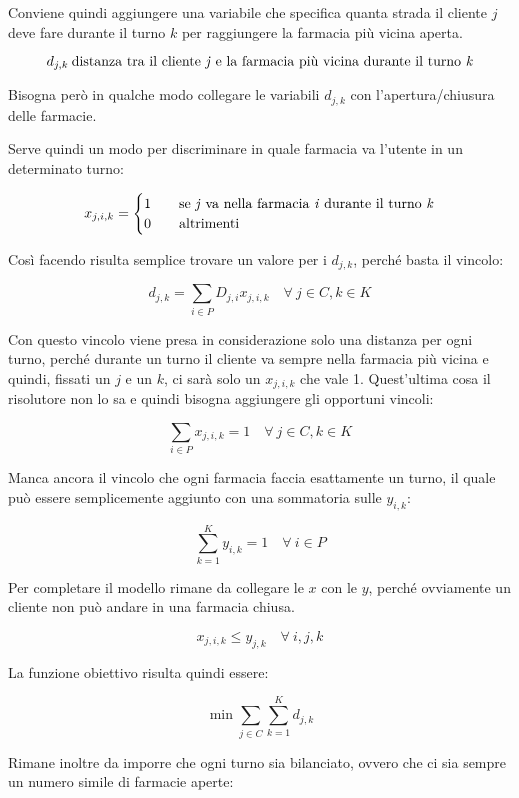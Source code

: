Conviene quindi aggiungere una variabile che specifica quanta strada il cliente $j$ deve fare durante il turno $k$ per raggiungere la farmacia più vicina aperta.

$$
d_{j,k} \: \text{distanza tra il cliente \textit{j} e la farmacia più vicina durante il turno \textit{k}}
$$

\noindent Bisogna però in qualche modo collegare le variabili $d_{j,k}$ con l'apertura/chiusura delle farmacie.

Serve quindi un modo per discriminare in quale farmacia va l'utente in un determinato turno:

$$
x_{j,i,k} = \begin{cases}
1 \quad & \text{se \textit{j} va nella farmacia \textit{i} durante il turno \textit{k}} \\
0 \quad &\text{altrimenti}
\end{cases}
$$

\noindent Così facendo risulta semplice trovare un valore per i $d_{j,k}$, perché basta il vincolo:

$$
d_{j,k} = \sum\limits_{i \in P} D_{j,i} x_{j,i,k} \quad \forall \:j \in C, k \in K
$$

\noindent Con questo vincolo viene presa in considerazione solo una distanza per ogni turno, perché durante un turno il cliente va sempre nella farmacia più vicina e quindi, fissati un $j$ e un $k$, ci sarà solo un $x_{j,i,k}$ che vale 1.
Quest'ultima cosa il risolutore non lo sa e quindi bisogna aggiungere gli opportuni vincoli:

$$
\sum\limits_{i \in P} x_{j,i,k} = 1 \quad \forall \: j \in C, k \in K
$$

\noindent Manca ancora il vincolo che ogni farmacia faccia esattamente un turno, il quale può essere semplicemente aggiunto con una sommatoria sulle $y_{i,k}$:

$$
\sum\limits_{k = 1}^{K} y_{i,k} = 1 \quad \forall \: i \in P
$$

\noindent Per completare il modello rimane da collegare le $x$ con le $y$, perché ovviamente un cliente non può andare in una farmacia chiusa.

$$
x_{j,i,k} \leq y_{j,k} \quad \forall \: i,j,k
$$

\noindent La funzione obiettivo risulta quindi essere:

$$
\min \sum\limits_{j \in C}\sum\limits_{k = 1}^{K} d_{j,k}
$$

\noindent Rimane inoltre da imporre che ogni turno sia bilanciato, ovvero che ci sia sempre un numero simile di farmacie aperte:

